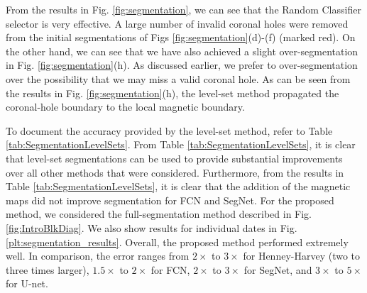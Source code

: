 \documentclass[journal]{IEEEtran}
\begin{document}
From the results in Fig. \ref{fig:segmentation}, we can see that
    the Random Classifier selector is very effective. 
A large number of invalid coronal holes were removed
    from the initial segmentations of     
    Figs \ref{fig:segmentation}(d)-(f) (marked red).
On the other hand, we can see that we have also achieved a slight
    over-segmentation in Fig. \ref{fig:segmentation}(h).
As discussed earlier, we prefer to over-segmentation  over
    the possibility that we may miss a valid coronal hole.        
As can be seen from the results in Fig. 
    \ref{fig:segmentation}(h), the level-set method propagated
    the coronal-hole boundary to the local magnetic boundary.



To document the accuracy provided by the level-set method,
   refer to Table \ref{tab:SegmentationLevelSets}.
From Table \ref{tab:SegmentationLevelSets}, it is clear
   that level-set segmentations can be used to provide
   substantial improvements over all other methods that
   were considered.
Furthermore, from the results in 
       Table \ref{tab:SegmentationLevelSets},
       it is clear that the addition of the magnetic
       maps did not improve segmentation for FCN and SegNet.
For the proposed method, we considered the full-segmentation
      method described in Fig. \ref{fig:IntroBlkDiag}.
We also show results for individual dates in Fig. \ref{plt:segmentation_results}.
Overall, the proposed method performed extremely well.
In comparison, 
    the error ranges from $2\times$ to $3\times$ for Henney-Harvey (two to three times larger),
    $1.5\times$ to $2\times$ for FCN, 
    $2\times$ to  $3\times$ for SegNet, and
    $3\times$ to  $5\times$ for U-net. 
\color{black}   




\end{document}
